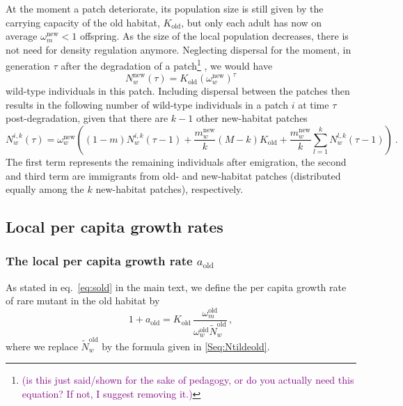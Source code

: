 \documentclass[11pt]{article}
\newcommand{\florence}[1]{\textcolor{purple}{(#1)}} %
\begin{document}
At the moment a patch deteriorate, its population size is still given by the carrying capacity of the old habitat, $K_{\text{old}}$, but only each adult has now on average $\omega_{m}^{\text{new}}<1$ offspring. As the size of the local population decreases, there is not need for density regulation anymore. Neglecting dispersal for the moment, in generation $\tau$ after the degradation of a patch\footnote{\florence{is this just said/shown for the sake of pedagogy, or do you actually need this equation? If not, I suggest removing it.}} , we would have 
	\begin{equation}
	N_w^{\text{new}}(\tau) = K_{\text{old}}(\omega_w^{\text{new}})^{\tau}
	\end{equation}
	wild-type individuals in this patch. Including dispersal between the patches then results in the following number of wild-type individuals in a patch $i$ at time $\tau$ post-degradation, given that there are $k-1$ other new-habitat patches
	\begin{equation}
	N_w^{i,k}(\tau) = \omega_w^{\text{new}}\left((1-m)N_w^{i,k}(\tau-1) + \frac{m_w^{\text{new}}}{k} (M-k) K_{\text{old}} + \frac{m_w^{\text{new}}}{k} \sum_{l=1}^k N_w^{l,k}(\tau-1) \right)\ .
	\end{equation}
	The first term represents the remaining individuals after emigration, the second and third term are immigrants from old- and new-habitat patches (distributed equally among the $k$ new-habitat patches), respectively. 

\subsection{Local per capita growth rates}
\subsubsection{The local per capita growth rate $a_{\text{old}}$}
As stated in eq.~\eqref{eq:sold} in the main text, we define the per capita growth rate of rare mutant in the old habitat by
\begin{equation}
1 + a_{\text{old}} = K_{\text{old}}\, \dfrac{\omega^\text{old}_m}{\omega^\text{old}_w \widetilde{N}_w^{\text{old}}}\, ,    
\end{equation}
%
where we replace $\widetilde{N}_w^{\text{old}}$ by the formula given in \eqref{Seq:Ntildeold}. 
\end{document}
